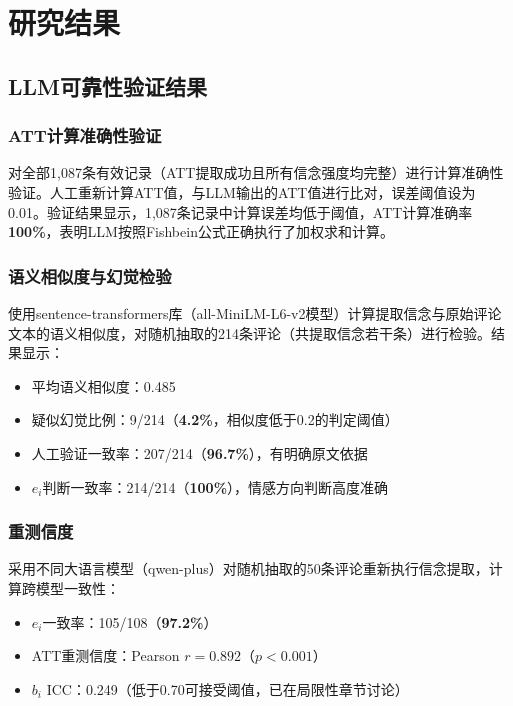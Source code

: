 \section{研究结果}

\subsection{LLM可靠性验证结果}

\subsubsection{ATT计算准确性验证}

对全部1{,}087条有效记录（ATT提取成功且所有信念强度均完整）进行计算准确性验证。人工重新计算ATT值，与LLM输出的ATT值进行比对，误差阈值设为0.01。验证结果显示，1{,}087条记录中计算误差均低于阈值，ATT计算准确率\textbf{100\%}，表明LLM按照Fishbein公式正确执行了加权求和计算。

\subsubsection{语义相似度与幻觉检验}

使用sentence-transformers库（all-MiniLM-L6-v2模型）计算提取信念与原始评论文本的语义相似度，对随机抽取的214条评论（共提取信念若干条）进行检验。结果显示：
\begin{itemize}
  \item 平均语义相似度：0.485
  \item 疑似幻觉比例：9/214（\textbf{4.2\%}，相似度低于0.2的判定阈值）
  \item 人工验证一致率：207/214（\textbf{96.7\%}），有明确原文依据
  \item $e_i$判断一致率：214/214（\textbf{100\%}），情感方向判断高度准确
\end{itemize}

\subsubsection{重测信度}

采用不同大语言模型（qwen-plus）对随机抽取的50条评论重新执行信念提取，计算跨模型一致性：
\begin{itemize}
  \item $e_i$一致率：105/108（\textbf{97.2\%}）
  \item ATT重测信度：Pearson $r=0.892$（$p<0.001$）
  \item $b_i$ ICC：0.249（低于0.70可接受阈值，已在局限性章节讨论）
\end{itemize}

